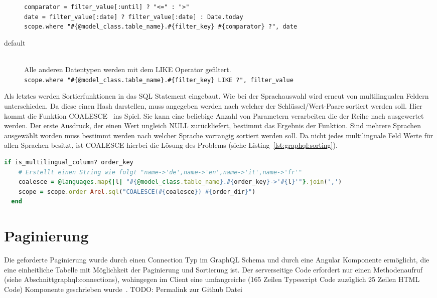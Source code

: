 \begin{description}
		\lstinline|comparator = filter_value[:until] ? "<=" : ">"| \\
		\lstinline|date = filter_value[:date] ? filter_value[:date] : Date.today| \\
		\lstinline|scope.where "#{@model_class.table_name}.#{filter_key} #{comparator} ?", date|
	\item[default] \ \\
		Alle anderen Datentypen werden mit dem LIKE Operator gefiltert. \\
		\lstinline|scope.where "#{@model_class.table_name}.#{filter_key} LIKE ?", filter_value|
\end{description}

Als letztes werden Sortierfunktionen in das SQL Statement eingebaut. Wie bei der Sprachauswahl wird erneut von multilingualen Feldern unterschieden.
Da diese einen Hash darstellen, muss angegeben werden nach welcher der Schlüssel/Wert-Paare sortiert werden soll. Hier kommt die Funktion COALESCE~\cite{coalesce-postgres} ins Spiel. Sie kann eine beliebige Anzahl von Parametern verarbeiten die der Reihe nach ausgewertet werden. Der erste Ausdruck, der einen Wert ungleich NULL zurückliefert, bestimmt das Ergebnis der Funktion. Sind mehrere Sprachen ausgewählt worden muss bestimmt werden nach welcher Sprache vorrangig sortiert werden soll. Da nicht jedes multilinguale Feld Werte für allen Sprachen besitzt, ist COALESCE hierbei die Lösung des Problems (siehe Listing~\ref{lst:graphql:sorting}).

\begin{lstlisting}[language=Ruby,float=h!,caption={Sortieren von Feldern in der Klasse BaseResolver}, label={lst:graphql:sorting}] 
  if is_multilingual_column? order_key
    # Erstellt einen String wie folgt "name->'de',name->'en',name->'it',name->'fr'"
    coalesce = @languages.map{|l| "#{@model_class.table_name}.#{order_key}->'#{l}'"}.join(',')
    scope = scope.order Arel.sql("COALESCE(#{coalesce}) #{order_dir}")
  end
\end{lstlisting}

\section{Paginierung}
Die geforderte Paginierung wurde durch einen Connection Typ im GraphQL Schema und durch eine Angular Komponente ermöglicht, die eine einheitliche Tabelle mit Möglichkeit der Paginierung und Sortierung ist.
Der serverseitige Code erfordert nur einen Methodenaufruf (siehe Abschnitt{graphql:connections}), wohingegen im Client eine umfangreiche (165 Zeilen Typescript Code zuzüglich 25 Zeilen HTML Code) Komponente geschrieben wurde~\cite{}.
TODO: Permalink zur Github Datei

